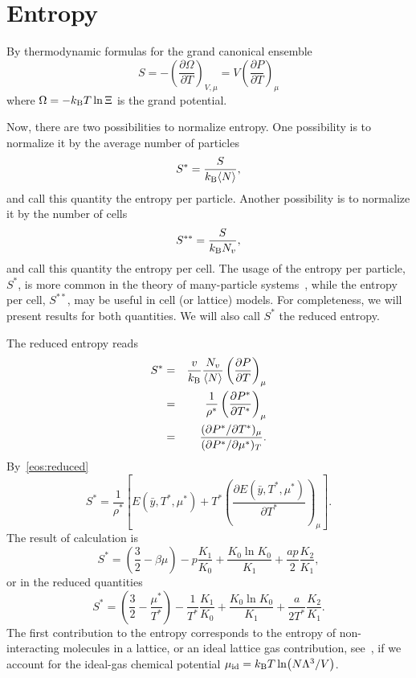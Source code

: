 \documentclass[12pt]{article}
\numberwithin{equation}{section}
\begin{document}
	\pagebreak
	\section{Entropy}
	By thermodynamic formulas for the grand canonical ensemble
	\begin{equation}
		S = -\left(\frac{\partial \Omega}{\partial T}\right)_{V,\mu} = V\left(\frac{\partial P}{\partial T}\right)_{\mu}
	\end{equation}
	where $\Omega = -k_{\rm B}T \ln \Xi$ is the grand potential. 
	
	Now, there are two possibilities to normalize entropy. One possibility is to normalize it by the average number of particles
	\begin{equation}
		S^{*} = \frac{S}{k_{\rm B} \langle N \rangle},
	\end{equation}
	and call this quantity the entropy per particle. Another possibility is to normalize it by the number of cells
	\begin{equation}
		S^{**} = \frac{S}{k_{\rm B}N_v},
	\end{equation}
	and call this quantity the entropy per cell. The usage of the entropy per particle, $S^*$, is more common in the theory of many-particle systems~\cite{HansenMcDonald13}, while the entropy per cell, $S^{**}$, may be useful in cell (or lattice) models. For completeness, we will present results for both quantities. We will also call $S^*$ the reduced entropy.
	
	
	The reduced entropy reads
	\begin{eqnarray}
		S^* & = & \frac{v}{k_{\rm B}} \frac{N_v}{\langle N \rangle} \left(\frac{\partial P}{\partial T}\right)_{\mu}
		\\
		& = & \frac{1}{\rho^*}\left(\frac{\partial P^*}{\partial T^*}\right)_{\mu}
		\\
		& = & \frac{(\partial P^* / \partial T^*)_{\mu}}{(\partial P^* / \partial \mu^*)_T}.
	\end{eqnarray}
	By~\eqref{eos:reduced}
	\begin{equation}
		\label{eq:entropy}
		S^* = \frac{1}{\rho^*} 
		\left[ 
		E(\bar{y},T^*,\mu^*) + T^* \left(\frac{\partial E(\bar{y},T^*,\mu^*)}{\partial T^*}\right)_{\mu} 
		\right].
	\end{equation}
	The result of calculation is
	\begin{equation}
		S^* = \left(\frac{3}{2} - \beta\mu\right) -p \frac{K_1}{K_0} + \frac{K_0 \ln K_0}{K_1} + \frac{ap}{2} \frac{K_2}{K_1},
	\end{equation}
	or in the reduced quantities
	\begin{equation}
		\label{S_vs_T_mu}
		S^* = \left(\frac{3}{2} - \frac{\mu^*}{T^*}\right) - \frac{1}{T^*}\frac{K_1}{K_0} + \frac{K_0 \ln K_0}{K_1} + \frac{a}{2T^*} \frac{K_2}{K_1}.
	\end{equation}
	The first contribution to the entropy corresponds to the entropy of non-interacting molecules in a lattice, or an ideal lattice gas contribution, see~\cite[(47.4)]{Hill56}, if we account for the ideal-gas chemical potential $\mu_{\rm id} = k_{\rm B}T \ln(N\Lambda^3/V)$. 
	
\end{document}
